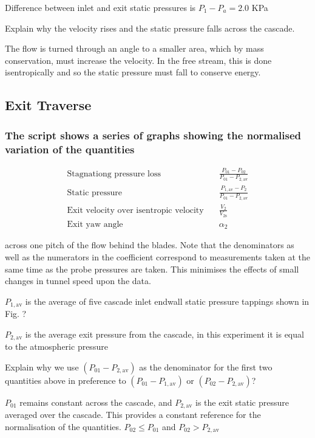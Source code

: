 \documentclass{article}
\begin{document}
Difference between inlet and exit static pressures is $P_1 - P_a = 2.0$ KPa

Explain why the velocity rises and the static pressure falls across the cascade.

The flow is turned through an angle to a smaller area, which by mass conservation, must increase the velocity.
In the free stream, this is done isentropically and so the static pressure must fall to conserve energy.

\subsection{Exit Traverse}
\subsubsection{The script shows a series of graphs showing the normalised variation of the quantities
}

\begin{align*}
    \text{Stagnationg pressure loss} \quad & \frac{P_{01} - P_{02}}{P_{01} - P_{2,\text{av}}} \\
    \text{Static pressure} \quad & \frac{P_{1,\text{av}} - P_2}{P_{01} - P_{2,\text{av}}} \\
    \text{Exit velocity over isentropic velocity} \quad & \frac{V_2}{V_{2\text{s}}} \\
    \text{Exit yaw angle} \quad & \alpha_2
\end{align*}

across one pitch of the flow behind the blades. Note that the denominators as well as the
numerators in the coefficient correspond to measurements taken at the same time as the probe
pressures are taken. This minimises the effects of small changes in tunnel speed upon the data.

$P_{1,\text{av}}$ is the average of five cascade inlet endwall static pressure tappings shown in Fig. ?

$P_{2,\text{av}}$ is the average exit pressure from the cascade, in this experiment it is equal to the
atmospheric pressure


Explain why we use $(P_{01} - P_{2,\text{av}})$ as the denominator for the first two quantities above in
preference to $(P_{01} - P_{1,\text{av}})$ or $(P_{02} - P_{2,\text{av}})$?

$P_{01}$ remains constant across the cascade, and $P_{2,\text{av}}$ is the exit static pressure averaged over the cascade.
This provides a constant reference for the normalisation of the quantities.
$ P_{02} \le P_{01} $ and $P_{02} > P_{2,\text{av}}$  %
\end{document}
